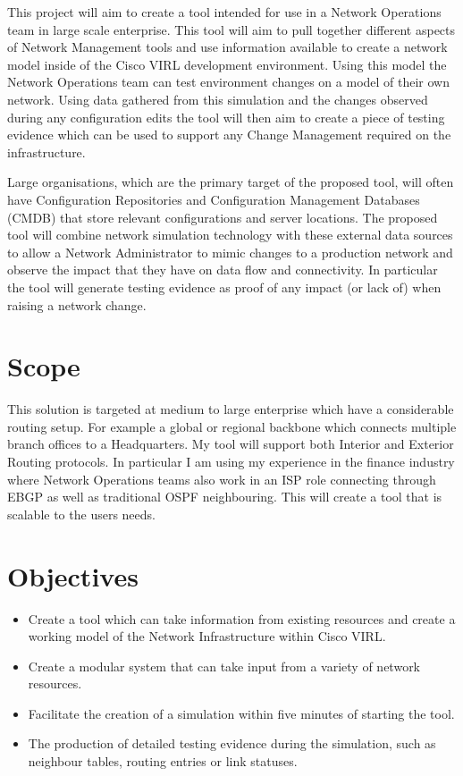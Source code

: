 \documentclass[11pt]{report}
\begin{document}
This project will aim to create a tool intended for use in a Network Operations team in large scale enterprise. This tool will aim to pull together different aspects of Network Management tools and use information available to create a network model inside of the Cisco VIRL development environment. Using this model the Network Operations team can test environment changes on a model of their own network. Using data gathered from this simulation and the changes observed during any configuration edits the tool will then aim to create a piece of testing evidence which can be used to support any Change Management required on the infrastructure.

Large organisations, which are the primary target of the proposed tool, will often have Configuration Repositories and Configuration Management Databases (CMDB) that store relevant configurations and server locations. The proposed tool will combine network simulation technology with these external data sources to allow a Network Administrator to mimic changes to a production network and observe the impact that they have on data flow and connectivity. In particular the tool will generate testing evidence as proof of any impact (or lack of) when raising a network change.

\section{Scope}

This solution is targeted at medium to large enterprise which have a considerable routing setup. For example a global or regional backbone which connects multiple branch offices to a Headquarters. My tool will support both Interior and Exterior Routing protocols. In particular I am using my experience in the finance industry where Network Operations teams also work in an ISP role connecting through EBGP as well as traditional OSPF neighbouring. This will create a tool that is scalable to the users needs. 

\section{Objectives}
\begin{itemize}
\item{Create a tool which can take information from existing resources and create a working model of the Network Infrastructure within Cisco VIRL.}
\item{Create a modular system that can take input from a variety of network resources.}
\item{Facilitate the creation of a simulation within five minutes of starting the tool.}
\item{The production of detailed testing evidence during the simulation, such as neighbour tables, routing entries or link statuses.}
\end{itemize}
\end{document}
